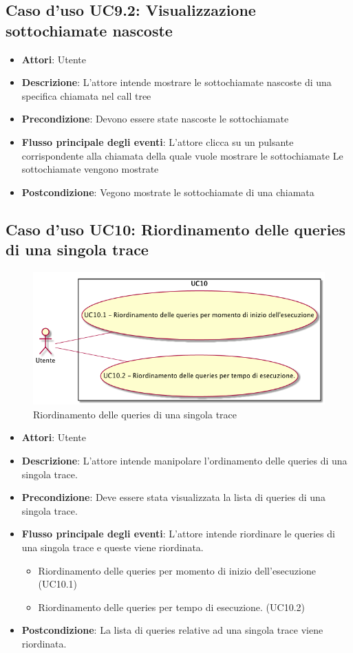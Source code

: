 \subsection{Caso d'uso UC9.2: Visualizzazione sottochiamate nascoste}
\begin{itemize}
\item \textbf{Attori}: Utente
\item \textbf{Descrizione}: L'attore intende mostrare le sottochiamate nascoste di una specifica chiamata nel call tree
\item \textbf{Precondizione}: Devono essere state nascoste le sottochiamate
\item \textbf{Flusso principale degli eventi}: L'attore clicca su un pulsante corrispondente alla chiamata della quale vuole mostrare le sottochiamate
Le sottochiamate vengono mostrate
\item \textbf{Postcondizione}: Vegono mostrate le sottochiamate di una chiamata
\end{itemize}
\subsection{Caso d'uso UC10: Riordinamento delle queries di una singola trace}
\begin{figure} [H]
\centering
\includegraphics[scale=0.45]{./UC/UC10.png}
\caption{Riordinamento delle queries di una singola trace}\label{}
\end{figure}
\begin{itemize}
\item \textbf{Attori}: Utente
\item \textbf{Descrizione}: L'attore intende manipolare l'ordinamento delle queries di una singola trace.
\item \textbf{Precondizione}: Deve essere stata visualizzata la lista di queries di una singola trace.
\item \textbf{Flusso principale degli eventi}: L'attore intende riordinare le queries di una singola trace e queste viene riordinata.
\begin{itemize}
\item Riordinamento delle queries per momento di inizio dell'esecuzione (UC10.1)
\item Riordinamento delle queries per tempo di esecuzione. (UC10.2)
\end{itemize}
\item \textbf{Postcondizione}: La lista di queries relative ad una singola trace viene riordinata.
\end{itemize}
